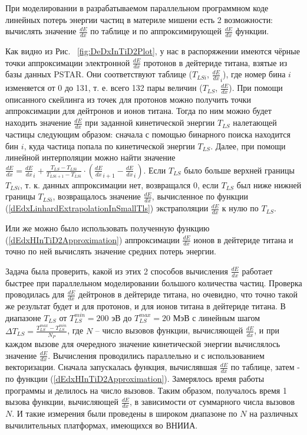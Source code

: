 \documentclass[a4paper,12pt]{article}
\begin{document}
\begin{large}
	При моделировании в разрабатываемом параллельном программном коде линейных потерь энергии частиц в материле мишени есть 2 возможности: вычислять значение $\frac{dE}{dx}$ по таблице и по аппроксимирующей $\frac{dE}{dx}$ функции.
	
	Как видно из Рис. ~\ref{fig:DeDxInTiD2Plot}, у нас в распоряжении имеются чёрные точки аппроксимации электронной $\frac{dE}{dx}$ протонов в дейтериде титана, взятые из базы данных PSTAR.
	Они соответствуют таблице ($T_{LSi}$, $\frac{dE}{dx}_i$), где номер бина $i$ изменяется от 0 до 131, т. е. всего 132 пары величин ($T_{LS}$, $\frac{dE}{dx}$).
	При помощи описанного скейлинга из точек для протонов можно получить точки аппроксимации для дейтронов и ионов титана.
	Тогда по ним можно будет находить значение $\frac{dE}{dx}$ при заданной кинетической энергии $T_{LS}$ налетающей частицы следующим образом: сначала с помощью бинарного поиска находится бин $i$, куда частица попала по кинетической энергии $T_{LS}$.
	Далее, при помощи линейной интерполяции можно найти значение $\frac{dE}{dx}=\frac{dE}{dx}_i+\frac{ T_{LS}-T_{LSi} }{ T_{LSi+1}-T_{LSi} } \cdot \left( \frac{dE}{dx}_{i+1}-\frac{dE}{dx}_{i} \right)$.
	Если $T_{LS}$ было больше верхней границы $T_{LSi}$, т. к. данных аппроксимации нет, возвращался 0, если $T_{LS}$ был ниже нижней границы $T_{LSi}$, возвращалось значение $\frac{dE}{dx}$, вычисленное по функции (\ref{dEdxLinhardExtrapolationInSmallTls}) экстраполяции $\frac{dE}{dx}$ к нулю по $T_{LS}$.
	
	 Или же можно было использовать полученную функцию (\ref{dEdxHInTiD2Approximation}) аппроксимации $\frac{dE}{dx}$ ионов в дейтериде титана и точно по ней вычислять значение средних потерь энергии.
	 
	 Задача была проверить, какой из этих 2 способов вычисления $\frac{dE}{dx}$ работает быстрее при параллельном моделировании большого количества частиц.
	 Проверка проводилась для $\frac{dE}{dx}$ дейтронов в дейтериде титана, но очевидно, что точно такой же результат будет и для протонов, и для ионов титана в дейтериде титана.
	 В диапазоне $T_{LS}$ от $T^{min}_{LS}=200$ эВ до $T^{max}_{LS}=20$ МэВ с линейным шагом $\Delta T_{LS}=\frac{T^{max}_{LS}-T^{min}_{LS}}{N_P}$, где $N$ -- число вызовов функции, вычисляющей $\frac{dE}{dx}$, и при каждом вызове для очередного значение кинетической энергии вычислялось значение $\frac{dE}{dx}$.
	 Вычисления проводились параллельно и с использованием векторизации. Сначала запускалась функция, вычислявшая $\frac{dE}{dx}$ по таблице, затем - по функции (\ref{dEdxHInTiD2Approximation}).
	 Замерялось время работы программы и делилось на число вызовов. Таким образом, получалось время 1 вызова функции, вычисляющей $\frac{dE}{dx}$, в зависимости от суммарного числа вызовов $N$.
	 И такие измерения были проведены в широком диапазоне по $N$ на различных вычилительных платформах, имеющихся во ВНИИА.
	 

\end{large}
\end{document}
